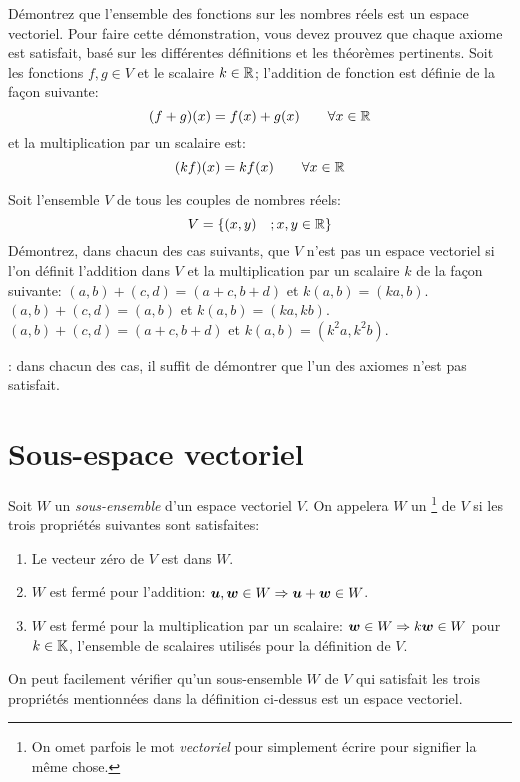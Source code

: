 \begin{exerciceC}
Démontrez que l'ensemble des fonctions sur les nombres réels est un espace vectoriel.  Pour faire cette démonstration, vous devez prouvez que chaque axiome est satisfait, basé sur les différentes définitions et les théorèmes pertinents. Soit les fonctions $f, g \in V$ et le scalaire $k\in \mathbb{R}$; l'addition de fonction est définie de la façon suivante:
\[
(f+g)(x) = f(x) + g(x) \qquad \forall x \in \mathbb{R}
\]
et la multiplication par un scalaire est:
\[
(kf)(x) = k f(x) \qquad \forall x \in \mathbb{R}
\]
\end{exerciceC}
\begin{exerciceC}
Soit l'ensemble $V$ de tous les couples de nombres réels:
\[
V = \{(x, y) \quad ; x, y \in \mathbb{R}\}
\]
Démontrez, dans chacun des cas suivants, que $V$ n'est pas un espace vectoriel si l'on définit l'addition dans $V$ et la multiplication par un scalaire $k$ de la façon suivante:
 $(a,b) + (c,d) = (a+c, b+d)$ et $k(a,b) = (ka, b)$.
 $(a,b) + (c,d) = (a, b)$ et $k(a,b) = (ka, kb)$.
 $(a,b) + (c,d) = (a+c, b+d)$ et $k(a,b) = (k^2a, k^2b)$.

\suggestion: dans chacun des cas, il suffit de démontrer que l'un des axiomes n'est pas satisfait.
\end{exerciceC}

\section{Sous-espace vectoriel}
\begin{defini}
Soit $W$ un \textit{sous-ensemble} d'un espace vectoriel $V$.  
On appelera $W$ un \footnote{On omet parfois le mot \textit{vectoriel}
pour simplement écrire  pour signifier la même chose.} de $V$ si
les trois propriétés suivantes sont satisfaites:
\begin{enumerate}
\item Le vecteur zéro de $V$ est dans $W$.
\item $W$ est fermé pour l'addition: $\boldsymbol{u}, \boldsymbol{w} \in W \Rightarrow \boldsymbol{u} + \boldsymbol{w} \in W$.
\item $W$ est fermé pour la multiplication par un scalaire: $\boldsymbol{w}\in W \Rightarrow k\boldsymbol{w}\in W$ pour $k\in \mathbb{K}$,
l'ensemble de scalaires utilisés pour la définition de $V$.
\end{enumerate}
\end{defini}
On peut facilement vérifier qu'un sous-ensemble $W$ de $V$ qui satisfait les trois propriétés mentionnées dans la définition ci-dessus est un espace vectoriel.

